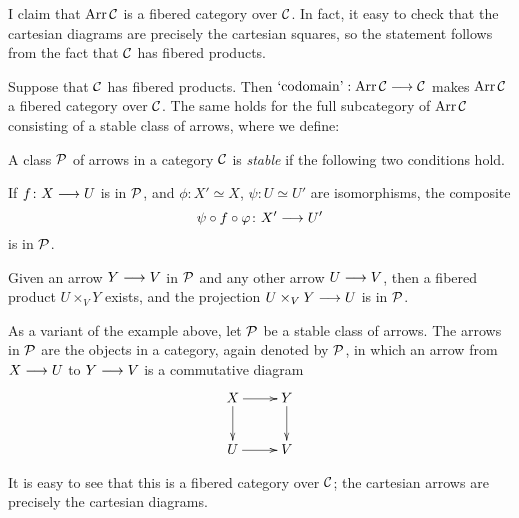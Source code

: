 \begin{3   FIBERED CATEGORIES}
\begin{3.2 Examples of fibered categories}
\begin{example}
I claim that $\operatorname{Arr} \mathcal{C}$ is a fibered category over $\mathcal{C}$. In fact, it easy to check that the cartesian diagrams are precisely the cartesian squares, so the statement follows from the fact that $\mathcal{C}$ has fibered products.
\begin{shaded}
Suppose that $\mathcal{C}$ has fibered products. Then $\textup{`codomain'}:\operatorname{Arr}\mathcal{C}\longrightarrow\mathcal{C}$ makes $\operatorname{Arr}\mathcal{C}$ a fibered category over $\mathcal{C}$. The same holds for the full subcategory of $\operatorname{Arr}\mathcal{C}$ consisting of a stable class of arrows, where we define:
\end{shaded}

\end{example}

\begin{definition}\label{def:stable-class}
A class $\mathcal{P}$ of arrows in a category $\mathcal{C}$ is \emph{stable}%
%
 if the following two conditions hold.

\begin{enumeratea}

\item If $f \colon X \arr U$ is in $\mathcal{P}$, and $\phi \colon X' \simeq X$, $\psi \colon U \simeq U'$ are isomorphisms, the composite
   \[
  \psi \circ f \circ \phi \colon  X' \arr U'
   \]
is in $\mathcal{P}$.

\item Given an arrow $Y \arr V$ in $\mathcal{P}$ and any other arrow $U \arr V$, then a fibered product $U \times_V Y$ exists, and the projection $U \times_V Y \arr U$ is in $\mathcal{P}$.

\end{enumeratea} 
\end{definition}

\begin{example}\label{ex:restrictedarrows} As a variant of the
example above, let $\mathcal{P}$ be a stable class of arrows. The arrows in $\mathcal{P}$ are the objects in a category, again denoted by $\mathcal{P}$, in which an arrow from $X \arr U$ to $Y \arr V$ is a commutative diagram
   \[
   \xymatrix{
   X \ar[r]\ar[d] & Y \ar[d] \\
   U \ar[r]       & V        \\
   }
   \]

It is easy to see that this is a fibered category over $\mathcal{C}$; the cartesian arrows are precisely the cartesian diagrams.

\end{example}



\end{3.2 Examples of fibered categories}
\end{3   FIBERED CATEGORIES}
